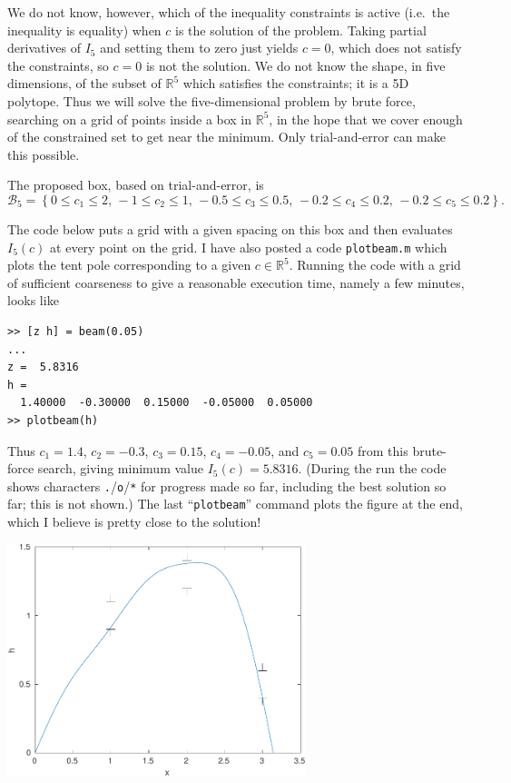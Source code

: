 \documentclass[11pt]{amsart}
\newcommand{\mfile}[2]{\bigskip
\begin{quote}
\VerbatimInput[frame=single,framesep=3mm,label=\fbox{\normalsize \textsl{\,#2\,}},fontfamily=courier,fontsize=\scriptsize]{#1}
\end{quote}
}
\newcommand{\RR}{\mathbb{R}}
\begin{document}
We do not know, however, which of the inequality constraints is active (i.e.~the inequality is equality) when $c$ is the solution of the problem.  Taking partial derivatives of $I_5$ and setting them to zero just yields $c=0$, which does not satisfy the constraints, so $c=0$ is not the solution.  We do not know the shape, in five dimensions, of the subset of $\RR^5$ which satisfies the constraints; it is a 5D polytope.  Thus we will solve the five-dimensional problem by brute force, searching on a grid of points inside a box in $\RR^5$, in the hope that we cover enough of the constrained set to get near the minimum.  Only trial-and-error can make this possible.

The proposed box, based on trial-and-error, is
	$$\mathcal{B}_5 = \left\{0 \le c_1 \le 2, \,
	                         -1 \le c_2 \le 1, \,
	                         -0.5 \le c_3 \le 0.5, \,
	                         -0.2 \le c_4 \le 0.2, \,
	                         -0.2 \le c_5 \le 0.2\right\}.$$

The code below puts a grid with a given spacing on this box and then evaluates $I_5(c)$ at every point on the grid.  I have also posted a code \texttt{plotbeam.m} which plots the tent pole corresponding to a given $c\in \RR^5$.  Running the code with a grid of sufficient coarseness to give a reasonable execution time, namely a few minutes, looks like

\medskip
\begin{Verbatim}[fontfamily=courier,fontsize=\scriptsize]
>> [z h] = beam(0.05)
...
z =  5.8316
h =
  1.40000  -0.30000  0.15000  -0.05000  0.05000
>> plotbeam(h)
\end{Verbatim}

\medskip
\noindent Thus $c_1=1.4$, $c_2=-0.3$, $c_3=0.15$, $c_4=-0.05$, and $c_5=0.05$ from this brute-force search, giving minimum value $I_5(c)=5.8316$.  (During the run the code shows characters \texttt{.}/\texttt{o}/\texttt{*} for progress made so far, including the best solution so far; this is not shown.)  The last ``\texttt{plotbeam}'' command plots the figure at the end, which I believe is pretty close to the solution!

\bigskip

\mfile{matlab/beam.m}{beam.m}

\bigskip
\begin{center}
\includegraphics[width=0.65\textwidth]{beam-soln-gates}
\end{center}
\end{document}
